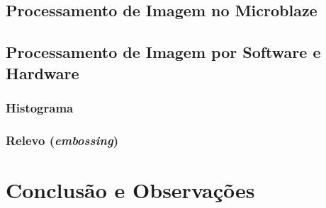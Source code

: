\documentclass[a4paper]{article}
\begin{document}
\subsection{Processamento de Imagem no Microblaze\texttrademark}

\subsection{Processamento de Imagem por Software e Hardware}
\subsubsection{Histograma}

\subsubsection{Relevo (\textit{embossing})}

\section{Conclusão e Observações}


\nocite{}
\end{document}
